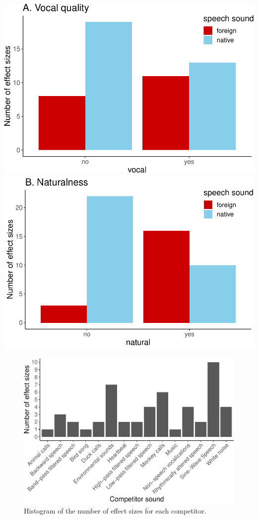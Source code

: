 \documentclass[man]{apa6}
\begin{document}
\includegraphics{MA_speech_pref_files/figure-latex/stimuli-1.pdf}
\includegraphics{MA_speech_pref_files/figure-latex/stimuli-2.pdf}

\begin{figure}
\centering
\includegraphics{MA_speech_pref_files/figure-latex/competitors-1.pdf}
\caption{\label{fig:competitors}Histogram of the number of effect sizes for
each competitor.}
\end{figure}
\end{document}
